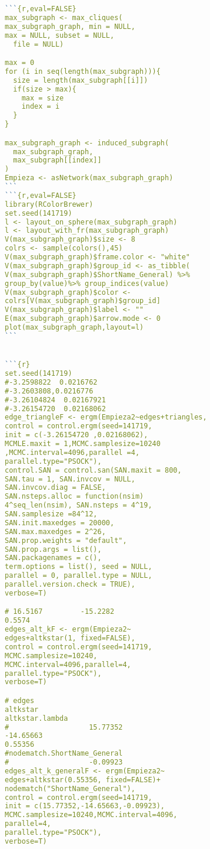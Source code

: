 \begin{lstlisting}[language=R]
```{r,eval=FALSE}
max_subgraph <- max_cliques(
max_subgraph_graph, min = NULL, 
max = NULL, subset = NULL,
  file = NULL)

max = 0
for (i in seq(length(max_subgraph))){
  size = length(max_subgraph[[i]])
  if(size > max){
    max = size
    index = i
  }
}

max_subgraph_graph <- induced_subgraph(
  max_subgraph_graph,
  max_subgraph[[index]]
)
Empieza <- asNetwork(max_subgraph_graph)
```
```{r,eval=FALSE}
library(RColorBrewer)
set.seed(141719)
l <- layout_on_sphere(max_subgraph_graph)
l <- layout_with_fr(max_subgraph_graph)
V(max_subgraph_graph)$size <- 8
colrs <- sample(colors(),45)
V(max_subgraph_graph)$frame.color <- "white"
V(max_subgraph_graph)$group_id <- as_tibble(
V(max_subgraph_graph)$ShortName_General) %>% 
group_by(value)%>% group_indices(value) 
V(max_subgraph_graph)$color <- 
colrs[V(max_subgraph_graph)$group_id]
V(max_subgraph_graph)$label <- "" 
E(max_subgraph_graph)$arrow.mode <- 0
plot(max_subgraph_graph,layout=l)
```


```{r}
set.seed(141719)
#-3.2598822  0.0216762
#-3.2603808,0.0216776
#-3.26104824  0.02167921 
#-3.26154720  0.02168062 
edge_triangleF <- ergm(Empieza2~edges+triangles,
control = control.ergm(seed=141719,
init = c(-3.26154720 ,0.02168062),
MCMLE.maxit = 1,MCMC.samplesize=10240
,MCMC.interval=4096,parallel =4,
parallel.type="PSOCK"),
control.SAN = control.san(SAN.maxit = 800, 
SAN.tau = 1, SAN.invcov = NULL,
SAN.invcov.diag = FALSE, 
SAN.nsteps.alloc = function(nsim)
4^seq_len(nsim), SAN.nsteps = 4^19, 
SAN.samplesize =84^12,
SAN.init.maxedges = 20000, 
SAN.max.maxedges = 2^26,
SAN.prop.weights = "default", 
SAN.prop.args = list(),
SAN.packagenames = c(), 
term.options = list(), seed = NULL,
parallel = 0, parallel.type = NULL, 
parallel.version.check = TRUE),
verbose=T)

# 16.5167         -15.2282           
0.5574 
edges_alt_kF <- ergm(Empieza2~
edges+altkstar(1, fixed=FALSE),
control = control.ergm(seed=141719,
MCMC.samplesize=10240,
MCMC.interval=4096,parallel=4,
parallel.type="PSOCK"),
verbose=T)

# edges                     
altkstar         
altkstar.lambda  
#                   15.77352                
-14.65663                 
0.55356  
#nodematch.ShortName_General  
#                   -0.09923  
edges_alt_k_generalF <- ergm(Empieza2~
edges+altkstar(0.55356, fixed=FALSE)+
nodematch("ShortName_General"),
control = control.ergm(seed=141719,
init = c(15.77352,-14.65663,-0.09923),
MCMC.samplesize=10240,MCMC.interval=4096,
parallel=4,
parallel.type="PSOCK"),
verbose=T)


\end{lstlisting}
